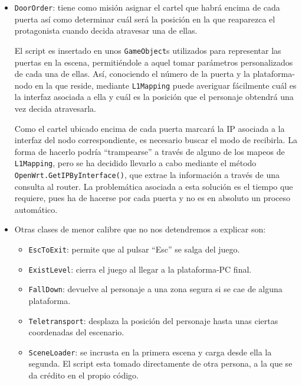 \begin{itemize}
\item \texttt{DoorOrder}: tiene como misión asignar el cartel que habrá encima de cada puerta así como determinar cuál será la posición en la que reaparezca el protagonista cuando decida atravesar una de ellas.

El script es insertado en unos \texttt{GameObject}s utilizados para representar las puertas en la escena, permitiéndole a aquel tomar parámetros personalizados de cada una de ellas. Así, conociendo el número de la puerta y la plataforma-nodo en la que reside, mediante \texttt{L1Mapping} puede averiguar fácilmente cuál es la interfaz asociada a ella y cuál es la posición que el personaje obtendrá una vez decida atravesarla.

Como el cartel ubicado encima de cada puerta marcará la IP asociada a la interfaz del nodo correspondiente, es necesario buscar el modo de recibirla. La forma de hacerlo podría ``trampearse'' a través de alguno de los mapeos de \texttt{L1Mapping}, pero se ha decidido llevarlo a cabo mediante el método \texttt{OpenWrt.GetIPByInterface()}, que extrae la información a través de una consulta al router. La problemática asociada a esta solución es el tiempo que requiere, pues ha de hacerse por cada puerta y no es en absoluto un proceso automático.

\item Otras clases de menor calibre que no nos detendremos a explicar son:
\begin{itemize}
\item \texttt{EscToExit}: permite que al pulsar ``Esc'' se salga del juego.
\item \texttt{ExistLevel}: cierra el juego al llegar a la plataforma-PC final.
\item \texttt{FallDown}: devuelve al personaje a una zona segura si se cae de alguna plataforma.
\item \texttt{Teletransport}: desplaza la posición del personaje hasta unas ciertas coordenadas del escenario.
\item \texttt{SceneLoader}: se incrusta en la primera escena y carga desde ella la segunda. El script esta tomado directamente de otra persona, a la que se da crédito en el propio código.
\end{itemize}

\end{itemize}
